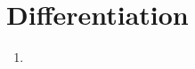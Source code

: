\documentclass[17pt]{extarticle}
\begin{document}
\begin{multicols}{2}
\begin{enumerate}
\end{enumerate} 

\section{Differentiation}
\noindent
\begin{enumerate}
\item 

\end{enumerate} 


\end{multicols}
 
\end{document}
